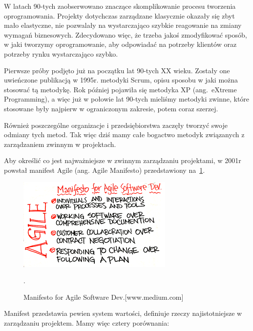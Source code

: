 W latach 90-tych zaobserwowano znaczące skomplikowanie procesu tworzenia oprogramowania.
Projekty dotychczas zarządzane klasycznie okazały się zbyt mało elastyczne,
nie pozwalały na wystarczająco szybkie reagowanie na zmiany wymagań biznesowych.
Zdecydowano więc, że trzeba jakoś zmodyfikować sposób, w jaki tworzymy oprogramowanie,
aby odpowiadać na potrzeby klientów oraz potrzeby rynku wystarczająco szybko.

Pierwsze próby podjęto już na początku lat 90-tych XX wieku. Zostały one uwieńczone publikacją w 1995r.
metodyki Scrum, opisu sposobu w jaki można stosować tą metodykę.
Rok później pojawiła się metodyka XP (ang.\ eXtreme Programming),
a więc już w połowie lat 90-tych mieliśmy metodyki zwinne, które stosowane były
najpierw w ograniczonym zakresie, potem coraz szerzej.

Również poszczególne organizacje i przedsiębiorstwa zaczęły tworzyć swoje odmiany tych metod.
Tak więc dziś mamy całe bogactwo metodyk związanych z zarządzaniem zwinnym w projektach.

Aby określić co jest najważniejsze w zwinnym zarządzaniu projektami, w 2001r powstał manifest Agile
(ang. Agile Manifesto) przedstawiony na~\ref{rys:agile}.

\begin{figure}
	\centering\includegraphics[width=.6\textwidth]{img/agile.png}
	\caption{Manifesto for Agile Software Dev.[www.medium.com]}.\label{rys:agile}
\end{figure}

Manifest przedstawia pewien system wartości, definiuje rzeczy najistotniejsze w zarządzaniu projektem.
Mamy więc cztery porównania:

